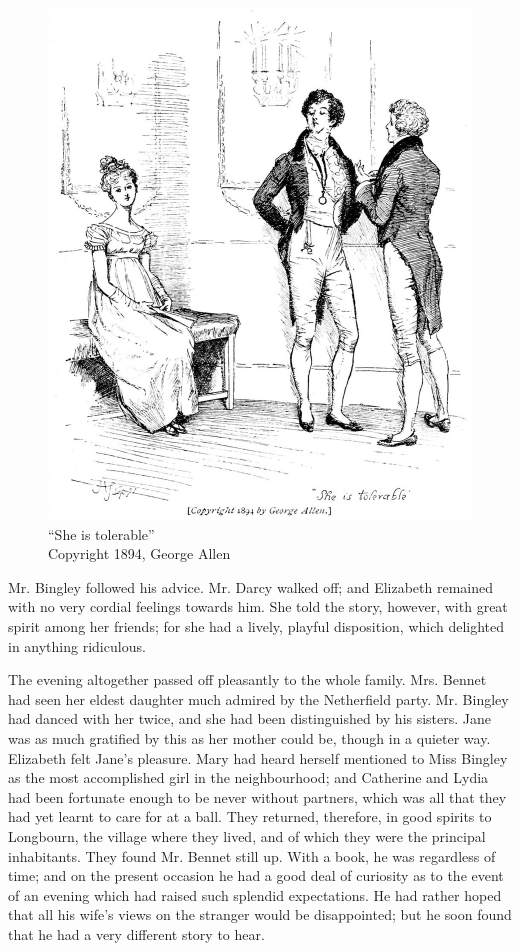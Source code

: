 \begin{figure}[htbp]
    \centering
    \includegraphics[width=\textwidth]{illustrations/i_044.jpg}
    \caption{“She is tolerable”\\ Copyright 1894, George Allen}
    \label{fig:image}
\end{figure}

Mr. Bingley followed his advice. Mr. Darcy walked off; and Elizabeth remained with no very cordial feelings towards him. She told the story, however, with great spirit among her friends; for she had a lively, playful disposition, which delighted in anything ridiculous.

The evening altogether passed off pleasantly to the whole family. Mrs. Bennet had seen her eldest daughter much admired by the Netherfield party. Mr. Bingley had danced with her twice, and she had been distinguished by his sisters. Jane was as much gratified by this as her mother could be, though in a quieter way. Elizabeth felt Jane's pleasure. Mary had heard herself mentioned to Miss Bingley as the most accomplished girl in the neighbourhood; and Catherine and Lydia had been fortunate enough to be never without partners, which was all that they had yet learnt to care for at a ball. They returned, therefore, in good spirits to Longbourn, the village where they lived, and of which they were the principal inhabitants. They found Mr. Bennet still up. With a book, he was regardless of time; and on the present occasion he had a good deal of curiosity as to the event of an evening which had raised such splendid expectations. He had rather hoped that all his wife's views on the stranger would be disappointed; but he soon found that he had a very different story to hear.

